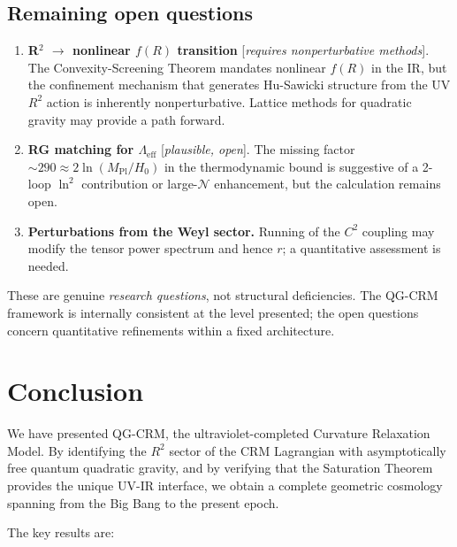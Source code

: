 \documentclass[aps,prd,twocolumn,superscriptaddress,nofootinbib]{revtex4-2}
\begin{document}
\subsection{Remaining open questions}

\begin{enumerate}
\item \textbf{R$^2$ $\to$ nonlinear $f(R)$ transition} [\textit{requires nonperturbative methods}]. The Convexity-Screening Theorem mandates nonlinear $f(R)$ in the IR, but the confinement mechanism that generates Hu-Sawicki structure from the UV $R^2$ action is inherently nonperturbative. Lattice methods for quadratic gravity may provide a path forward.

\item \textbf{RG matching for $\Lambda_\mathrm{eff}$} [\textit{plausible, open}]. The missing factor $\sim 290 \approx 2\ln(M_\mathrm{Pl}/H_0)$ in the thermodynamic bound is suggestive of a 2-loop $\ln^2$ contribution or large-$\mathcal{N}$ enhancement, but the calculation remains open.

\item \textbf{Perturbations from the Weyl sector.} Running of the $C^2$ coupling may modify the tensor power spectrum and hence $r$; a quantitative assessment is needed.
\end{enumerate}

These are genuine \textit{research questions}, not structural deficiencies. The QG-CRM framework is internally consistent at the level presented; the open questions concern quantitative refinements within a fixed architecture.


\section{Conclusion}
\label{sec:conclusion}

We have presented QG-CRM, the ultraviolet-completed Curvature Relaxation Model. By identifying the $R^2$ sector of the CRM Lagrangian with asymptotically free quantum quadratic gravity, and by verifying that the Saturation Theorem provides the unique UV-IR interface, we obtain a complete geometric cosmology spanning from the Big Bang to the present epoch.

The key results are:
\end{document}
